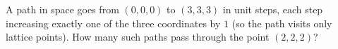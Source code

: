 A path in space goes from $(0,0,0)$ to $(3,3,3)$ in unit steps, each step increasing exactly one of the three coordinates by $1$ (so the path visits only lattice points). How many such paths pass through the point $(2,2,2)$?

